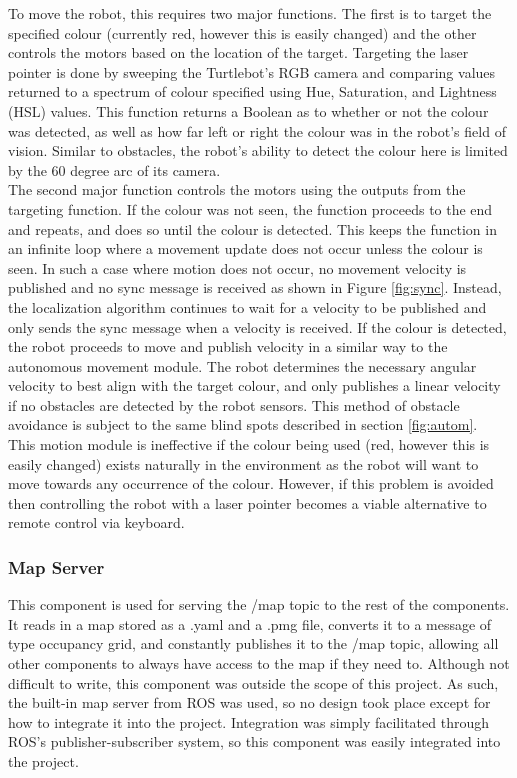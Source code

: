 \documentclass{article}
\newcommand\tab[1][0.5cm]{\hspace*{#1}}
\begin{document}
To move the robot, this requires two major functions. The first is to target the specified colour (currently red, however this is easily changed) and the other controls the motors based on the location of the target. Targeting the laser pointer is done by sweeping the Turtlebot's RGB camera and comparing values returned to a spectrum of colour specified using Hue, Saturation, and Lightness (HSL) values. This function returns a Boolean as to whether or not the colour was detected, as well as how far left or right the colour was in the robot's field of vision. Similar to obstacles, the robot's ability to detect the colour here is limited by the 60 degree arc of its camera.\\

The second major function controls the motors using the outputs from the targeting function. If the colour was not seen, the function proceeds to the end and repeats, and does so until the colour is detected. This keeps the function in an infinite loop where a movement update does not occur unless the colour is seen. In such a case where motion does not occur, no movement velocity is published and no sync message is received as shown in Figure \ref{fig:sync}. Instead, the localization algorithm continues to wait for a velocity to be published and only sends the sync message when a velocity is received. If the colour is detected, the robot proceeds to move and publish velocity in a similar way to the autonomous movement module. The robot determines the necessary angular velocity to best align with the target colour, and only publishes a linear velocity if no obstacles are detected by the robot sensors. This method of obstacle avoidance is subject to the same blind spots described in section \ref{fig:autom}.\\

This motion module is ineffective if the colour being used (red, however this is easily changed) exists naturally in the environment as the robot will want to move towards any occurrence of the colour. However, if this problem is avoided then controlling the robot with a laser pointer becomes a viable alternative to remote control via keyboard.\\

\subsubsection{Map Server}
\tab This component is used for serving the /map topic to the rest of the components. It reads in a map stored as a .yaml and a .pmg file, converts it to a message of type occupancy grid, and constantly publishes it to the /map topic, allowing all other components to always have access to the map if they need to. Although not difficult to write, this component was outside the scope of this project. As such, the built-in map server from ROS was used, so no design took place except for how to integrate it into the project. Integration was simply facilitated through ROS’s publisher-subscriber system, so this component was easily integrated into the project.
\end{document}
